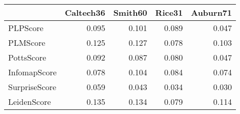 \begin{tabular}{lrrrr}
\toprule
{} & Caltech36 & Smith60 & Rice31 & Auburn71 \\
\midrule
PLPScore      &     0.095 &   0.101 &  0.089 &    0.047 \\
PLMScore      &     0.125 &   0.127 &  0.078 &    0.103 \\
PottsScore    &     0.092 &   0.087 &  0.080 &    0.047 \\
InfomapScore  &     0.078 &   0.104 &  0.084 &    0.074 \\
SurpriseScore &     0.059 &   0.043 &  0.034 &    0.030 \\
LeidenScore   &     0.135 &   0.134 &  0.079 &    0.114 \\
\bottomrule
\end{tabular}
